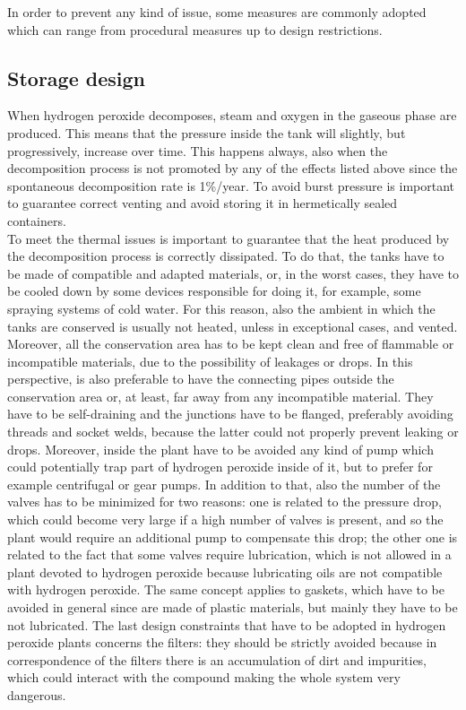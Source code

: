 \documentclass[a4paper]{report}
\begin{document}
In order to prevent any kind of issue, some measures are commonly adopted which can range from procedural measures up to design restrictions. \\

\subsection{Storage design}

When hydrogen peroxide decomposes, steam and oxygen in the gaseous phase are produced. This means that the pressure inside the tank will slightly, but progressively, increase over time. This happens always, also when the decomposition process is not promoted by any of the effects listed above since the spontaneous decomposition rate is 1\%/year. To avoid burst pressure is important to guarantee correct venting and avoid storing it in hermetically sealed containers. \\
To meet the thermal issues is important to guarantee that the heat produced by the decomposition process is correctly dissipated. To do that, the tanks have to be made of compatible and adapted materials, or, in the worst cases, they have to be cooled down by some devices responsible for doing it, for example, some spraying systems of cold water. For this reason, also the ambient in which the tanks are conserved is usually not heated, unless in exceptional cases, and vented. Moreover, all the conservation area has to be kept clean and free of flammable or incompatible materials, due to the possibility of leakages or drops. In this perspective, is also preferable to have the connecting pipes outside the conservation area or, at least, far away from any incompatible material. They have to be self-draining and the junctions have to be flanged, preferably avoiding threads and socket welds, because the latter could not properly prevent leaking or drops. Moreover, inside the plant have to be avoided any kind of pump which could potentially trap part of hydrogen peroxide inside of it, but to prefer for example centrifugal or gear pumps. In addition to that, also the number of the valves has to be minimized for two reasons: one is related to the pressure drop, which could become very large if a high number of valves is present, and so the plant would require an additional pump to compensate this drop; the other one is related to the fact that some valves require lubrication, which is not allowed in a plant devoted to hydrogen peroxide because lubricating oils are not compatible with hydrogen peroxide. The same concept applies to gaskets, which have to be avoided in general since are made of plastic materials, but mainly they have to be not lubricated. The last design constraints that have to be adopted in hydrogen peroxide plants concerns the filters: they should be strictly avoided because in correspondence of the filters there is an accumulation of dirt and impurities, which could interact with the compound making the whole system very dangerous. \\
\end{document}
